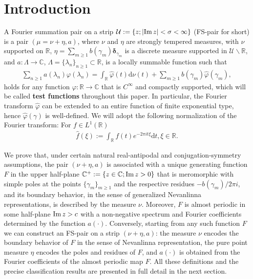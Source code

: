 \documentclass[a4paper,reqno,12pt]{amsart}
\newcommand{\U}{\mathcal{U}}
\renewcommand{\r}{\mathbb{R}}
\newcommand{\cp}{\mathbb{C}} %
\newcommand{\ft}{\widehat}
\newcommand{\bo}{\boldsymbol}
\newcommand{\la}{\lambda}
\newcommand{\ga}{\gamma}
\newcommand{\p}{\varphi}
\renewcommand{\d}{\mathrm{d}}
\newcommand{\cd}{\cdot}
\newcommand{\1}{{\bf 1}}
\newcommand{\ra}{\rightarrow}
\newcommand{\del}{{\bo \delta}}
\renewcommand{\Im}{{\rm Im}\,}
\begin{document}


\maketitle








\section{Introduction}
A Fourier summation pair on a strip $\U:=\{z;|\Im{z}|<\sigma<\infty\}$ (FS-pair for short) is a pair $(\mu=\nu+\eta,a)$, where $\nu$ and $\eta$ are strongly tempered measures, with $\nu$ supported on $\r$, $\eta=\sum_{m\geq1} b(\ga_m)\del_{\ga_m}$ is a discrete measure supported in $\U\backslash\r$, and $a:\Lambda\rightarrow\cp$, $\Lambda=\{\la_n\}_{n\geq1}\subset\r$, is a locally summable function such that
\begin{align}
    \sum_{n\geq1} a(\la_n)\p(\la_n)=\int_{\r} \ft{\p}(t)\d\nu(t)+\sum_{m\geq1} b(\ga_m)\ft{\p}(\ga_m),
\end{align}
holds for any function $\p:\r\ra\cp$ that is $C^\infty$ and compactly supported, which will be called \textbf{test functions} throughout this paper. In particular, the Fourier transform $\ft{\p}$ can be extended to an entire function of finite exponential type, hence $\ft{\p}(\ga)$ is well-defined. We will adopt the following normalization of the Fourier transform: For $f\in L^1(\r)$
\begin{align*}
    \ft{f}(\xi):=\int_{\r} f(t)e^{-2\pi it\xi}\d t, \xi\in\r.
\end{align*}

We prove that, under certain natural real-antipodal and conjugation-symmetry assumptions, the pair $(\nu+\eta,a)$ is associated with a unique generating function $F$ in the upper half-plane $\cp^+:=\{z\in\cp;\Im{z}>0\}$ that is meromorphic with simple poles at the points $\{\ga_m\}_{m\geq1}$ and the respective residues $-b(\ga_m)/2\pi i$, and its boundary behavior, in the sense of generalized Nevanlinna representations, is described by the measure $\nu$. Moreover, $F$ is almost periodic in some half-plane $\Im{z}>c$ with a non-negative spectrum and Fourier coefficients determined by the function $a(\cd)$. Conversely, starting from any such function $F$ we can construct an FS-pair on a strip $(\nu+\eta,a)$: the measure $\nu$ encodes the boundary behavior of $F$ in the sense of Nevanlinna representation, the pure point measure $\eta$ encodes the poles and residues of $F$, and $a(\cd)$ is obtained from the Fourier coefficients of the almost periodic map $F$. All these definitions and the precise classification results are presented in full detail in the next section.
\end{document}
